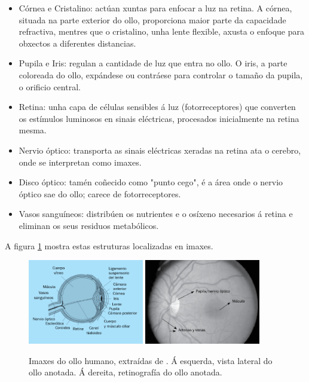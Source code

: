  \begin{itemize}
 \item Córnea e Cristalino: actúan xuntas para enfocar a luz na retina. A córnea, situada na parte exterior do ollo, proporciona maior parte da capacidade refractiva, mentres que o cristalino, unha lente flexible, axusta o enfoque para obxectos a diferentes distancias.
 \item Pupila e Iris: regulan a cantidade de luz que entra no ollo. O iris, a parte coloreada do ollo, expándese ou contráese para controlar o tamaño da pupila, o orificio central.
 \item Retina: unha capa de células sensibles á luz (fotorreceptores) que converten os estímulos luminosos en sinais eléctricas, procesados inicialmente na retina mesma.
 \item Nervio óptico: transporta as sinais eléctricas xeradas na retina ata o cerebro, onde se interpretan como imaxes.
 \item Disco óptico: tamén coñecido como "punto cego", é a área onde o nervio óptico sae do ollo; carece de fotorreceptores.
 \item Vasos sanguíneos: distribúen os nutrientes e o osíxeno necesarios á retina e eliminan os seus residuos metabólicos.
 \end{itemize}

A figura \ref{fig:imaxes_ojo} mostra estas estruturas localizadas en imaxes.

\begin{figure}[tbp]
    \centering
    \includegraphics[width=0.45\textwidth]{imaxes/ojo1.png}
    \includegraphics[width=0.45\textwidth]{imaxes/ojo2.png}
    \caption{Imaxes do ollo humano, extraídas de \cite{visionyojo}. Á esquerda, vista lateral do ollo anotada. Á dereita, retinografía do ollo anotada.}
    \label{fig:imaxes_ojo}
\end{figure}

